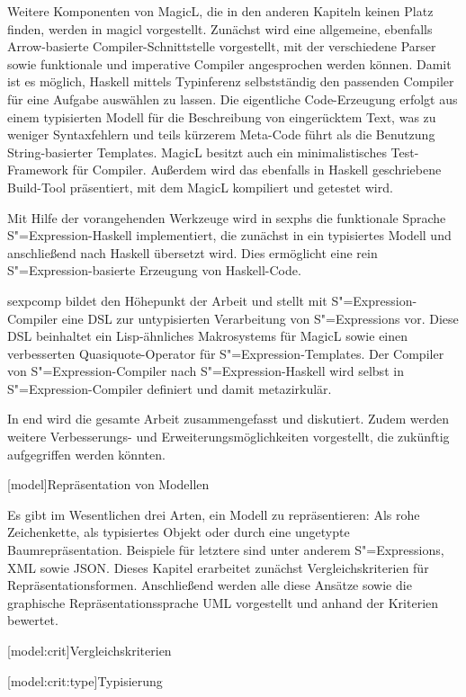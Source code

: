 \documentclass[11pt, a4paper, bibgerm]{scrbook}
\newcommand\lchapter{}
\newcommand\lsection{}
\newcommand\lsubsection{}
\newcommand\cref{}
\newcommand{\sexp}{S"=Expression}
\newcommand{\sexps}{S"=Expressions}
\begin{document}
Weitere Komponenten von MagicL, die in den anderen Kapiteln keinen Platz
finden, werden in \cref{magicl} vorgestellt. Zunächst wird eine
allgemeine, ebenfalls Arrow-basierte Compiler-Schnittstelle vorgestellt,
mit der verschiedene Parser sowie funktionale und imperative Compiler
angesprochen werden können. Damit ist es möglich, Haskell mittels
Typinferenz selbstständig den passenden Compiler für eine Aufgabe
auswählen zu lassen.  Die eigentliche Code-Erzeugung erfolgt aus einem
typisierten Modell für die Beschreibung von eingerücktem Text, was zu
weniger Syntaxfehlern und teils kürzerem Meta-Code führt als die
Benutzung String-basierter Templates. MagicL besitzt auch ein
minimalistisches Test-Framework für Compiler. Außerdem wird das
ebenfalls in Haskell geschriebene Build-Tool präsentiert, mit dem MagicL
kompiliert und getestet wird.

Mit Hilfe der vorangehenden Werkzeuge wird in \cref{sexphs} die
funktionale Sprache \sexp{}-Haskell implementiert, die zunächst in ein
typisiertes Modell und anschließend nach Haskell übersetzt wird. Dies
ermöglicht eine rein \sexp{}-basierte Erzeugung von Haskell-Code.

\cref{sexpcomp} bildet den Höhepunkt der Arbeit und stellt mit
\sexp{}-Compiler eine DSL zur untypisierten Verarbeitung von \sexps{}
vor. Diese DSL beinhaltet ein Lisp-ähnliches Makrosystems für MagicL
sowie einen verbesserten Quasiquote-Operator für \sexp{}-Templates. Der
Compiler von \sexp{}-Compiler nach \sexp{}-Haskell wird selbst in
\sexp{}-Compiler definiert und damit metazirkulär.

In \cref{end} wird die gesamte Arbeit zusammengefasst und
diskutiert. Zudem werden weitere Verbesserungs- und
Erweiterungsmöglichkeiten vorgestellt, die zukünftig aufgegriffen werden
könnten.

\lchapter[model]{Repräsentation von Modellen}

Es gibt im Wesentlichen drei Arten, ein Modell zu repräsentieren: Als
rohe Zeichenkette, als typisiertes Objekt oder durch eine ungetypte
Baumrepräsentation. Beispiele für letztere sind unter anderem \sexps{}, XML
sowie JSON. Dieses Kapitel erarbeitet zunächst Vergleichskriterien für
Repräsentationsformen. Anschließend werden alle diese Ansätze sowie die
graphische Repräsentationssprache UML vorgestellt und anhand der
Kriterien bewertet.

\lsection[model:crit]{Vergleichskriterien}

\lsubsection[model:crit:type]{Typisierung}
\end{document}
